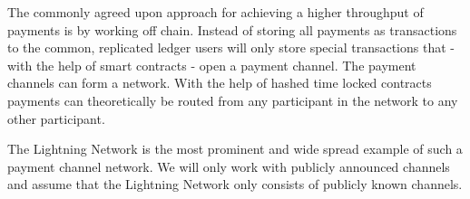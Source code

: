 \documentclass[a4paper]{paper}
\begin{document}
The commonly agreed upon approach for achieving a higher throughput of payments is by working off chain.
Instead of storing all payments as transactions to the common, replicated ledger users will only store special transactions that - with the help of smart contracts - open a payment channel.
The payment channels can form a network.
With the help of hashed time locked contracts payments can theoretically be routed from any participant in the network to any other participant. 

The Lightning Network is the most prominent and wide spread example of such a payment channel network.
We will only work with publicly announced channels and assume that the Lightning Network only consists of publicly known channels.


\null\newpage
\begin{minipage}[t]{0.8\linewidth}
  
\end{minipage}
\end{document}
